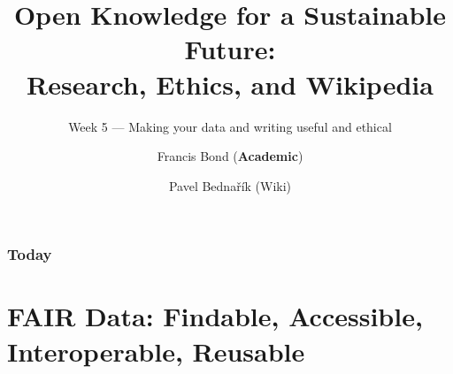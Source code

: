 \documentclass[aspectratio=169]{beamer}
\title[FAIR ethical research]{Open Knowledge for a Sustainable Future:\\ Research, Ethics, and Wikipedia}
\subtitle{Week 5 — Making your data and writing useful and ethical}
\author[Bond \& Bednařík]{Francis Bond (\textbf{Academic}) \and Pavel Bednařík (Wiki)}
\institute[UPOL \& Wikimedia]{Palacký University Olomouc \quad | \quad Wikimedia ČR}
\date{}
\begin{document}
\begin{frame}
  \titlepage
\end{frame}

\begin{frame}
  \frametitle{Today}
  \small
  \tableofcontents[hideallsubsections]
\end{frame}

\section{FAIR Data: Findable, Accessible, Interoperable, Reusable}
\end{document}
